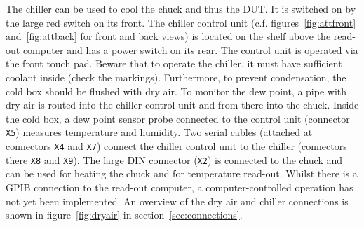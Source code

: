 \documentclass[a4paper]{article}
\begin{document}
The chiller can be used to cool the chuck and thus the DUT.
It is switched on by the large red switch on its front.
The chiller control unit (c.f. figures~\ref{fig:attfront} and~\ref{fig:attback} for front and back views) is located on the shelf above the read-out computer and has a power switch on its rear.
The control unit is operated via the front touch pad.
Beware that to operate the chiller, it must have sufficient coolant inside (check the markings).
Furthermore, to prevent condensation, the cold box should be flushed with dry air.
To monitor the dew point, a pipe with dry air is routed into the chiller control unit and from there into the chuck.
Inside the cold box, a dew point sensor probe connected to the control unit (connector {\tt X5}) measures temperature and humidity.
Two serial cables (attached at connectors {\tt X4} and {\tt X7}) connect the chiller control unit to the chiller (connectors there {\tt X8} and {\tt X9}).
The large DIN connector ({\tt X2}) is connected to the chuck and can be used for heating the chuck and for temperature read-out.
Whilst there is a GPIB connection to the read-out computer, a computer-controlled operation has not yet been implemented.
An overview of the dry air and chiller connections is shown in figure~\ref{fig:dryair} in section~\ref{sec:connections}.\\
\end{document}
